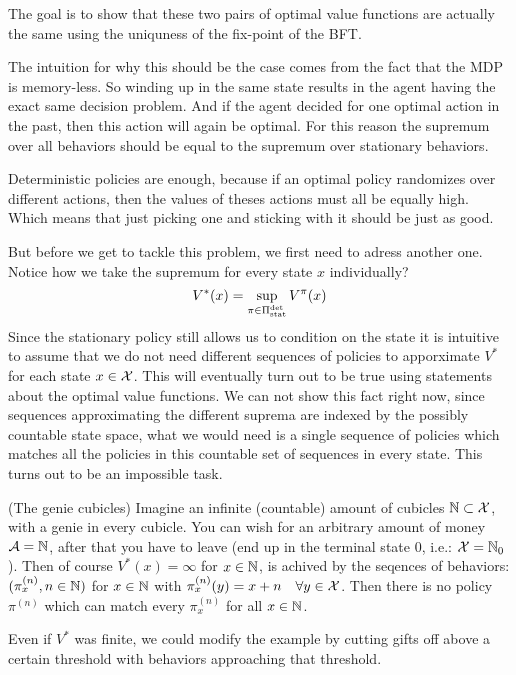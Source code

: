 The goal is to show that these two pairs of optimal value functions are actually the same using the uniquness of the fix-point of the BFT. 

The intuition for why this should be the case comes from the fact that the MDP is memory-less. So winding up in the same state results in the agent having the exact same decision problem. And if the agent decided for one optimal action in the past, then this action will again be optimal. For this reason the supremum over all behaviors should be equal to the supremum over stationary behaviors. 

Deterministic policies are enough, because if an optimal policy randomizes over different actions, then the values of theses actions must all be equally high. Which means that just picking one and sticking with it should be just as good.

But before we get to tackle this problem, we first need to adress another one. Notice how we take the supremum for every state \(x\) individually? 
\begin{equation*}
V^*(x)=\sup_{\pi\in\Pi_{\textnormal{stat}}^{\textnormal{det}}}V^\pi(x) 
\end{equation*}
Since the stationary policy still allows us to condition on the state it is intuitive to assume that we do not need different sequences of policies to apporximate \(V^*\) for each state \(x\in\mathcal{X}\). This will eventually turn out to be true using statements about the optimal value functions. We can not show this fact right now, since sequences approximating the different suprema are indexed by the possibly countable state space, what we would need is a single sequence of policies which matches all the policies in this countable set of sequences in every state. This turns out to be an impossible task.

\begin{example} (The genie cubicles)
Imagine an infinite (countable) amount of cubicles \(\mathbb{N} \subset \mathcal{X}\), with a genie in every cubicle. You can wish for an arbitrary amount of money \(\mathcal{A}=\mathbb{N}\), after that you have to leave (end up in the terminal state \(0\), i.e.: \(\mathcal{X}=\mathbb{N}_0\)). Then of course \(V^*(x)=\infty\) for \(x\in\mathbb{N}\), is achived by the seqences of behaviors: \((\pi_x^{(n)}, n\in\mathbb{N})\) for \(x\in\mathbb{N}\) with \(\pi_x^{(n)}(y)=x+n\quad \forall y\in\mathcal{X}\). Then there is no policy \(\pi^{(n)}\) which can match every \(\pi_x^{(n)}\) for all \(x\in\mathbb{N}\).

Even if \(V^*\) was finite, we could modify the example by cutting gifts off above a certain threshold with behaviors approaching that threshold. 
\end{example}

